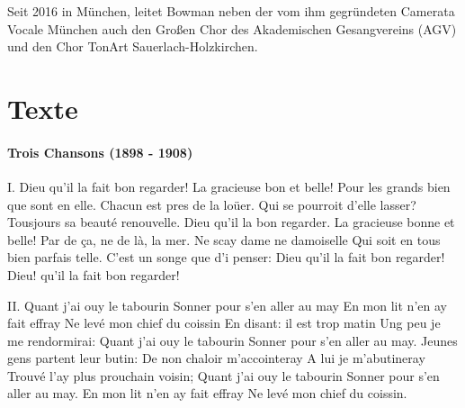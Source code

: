 \documentclass[11pt, ngermanm, titlepage]{article}
\begin{document}
\begin{multicols}{2}
	Seit 2016 in München, leitet Bowman neben der vom ihm gegründeten Camerata Vocale München auch den Großen Chor des Akademischen Gesangvereins (AGV) und den Chor TonArt Sauerlach-Holzkirchen.
	\vfill
	\pagebreak
	
	\section*{Texte}
	
	\paragraph{Trois Chansons (1898 - 1908)\newline}
	I. Dieu qu'il la fait bon regarder!\newline
	La gracieuse bon et belle!\newline
	Pour les grands bien que sont en elle.\newline
	Chacun est pres de la loüer.\newline
	Qui se pourroit d'elle lasser?\newline
	Tousjours sa beauté renouvelle.\newline
	Dieu qu'il la bon regarder.\newline
	La gracieuse bonne et belle!\newline
	Par de ça, ne de là, la mer.\newline
	Ne scay dame ne damoiselle\newline
	Qui soit en tous bien parfais telle.\newline
	C'est un songe que d'i penser:\newline
	Dieu qu'il la fait bon regarder!\newline
	Dieu! qu'il la fait bon regarder!\newline
		
	II. Quant j'ai ouy le tabourin\newline
	Sonner pour s'en aller au may\newline
	En mon lit n'en ay fait effray\newline
	Ne levé mon chief du coissin\newline
	En disant: il est trop matin\newline
	Ung peu je me rendormirai:\newline
	Quant j'ai ouy le tabourin\newline
	Sonner pour s'en aller au may.\newline
	Jeunes gens partent leur butin:\newline
	De non chaloir m'accointeray\newline
	A lui je m'abutineray\newline
	Trouvé l'ay plus prouchain voisin;\newline
	Quant j'ai ouy le tabourin\newline
	Sonner pour s'en aller au may.\newline
	En mon lit n'en ay fait effray\newline
	Ne levé mon chief du coissin.\newline
	

\end{multicols}
\end{document}
